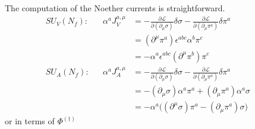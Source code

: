 The computation of the Noether currents is straightforward.
\begin{subequations}
    \begin{align}
        &&SU_V(N_f):&&\alpha^aJ_V^{a,\mu}&=-\frac{\partial\mathscr{L}}{\partial(\partial_\mu\sigma)}\delta\sigma-\frac{\partial\mathscr{L}}{\partial(\partial_\mu\pi^a)}\delta\pi^a&&&&\\
        &&&&&=(\partial^\mu\pi^a)\epsilon^{abc}\alpha^b\pi^c\\
        &&&&&=-\alpha^a\epsilon^{abc}(\partial^\mu\pi^b)\pi^c\\
        &&SU_A(N_f):&&\alpha^aJ_A^{a,\mu}&=-\frac{\partial\mathscr{L}}{\partial(\partial_\mu\sigma)}\delta\sigma-\frac{\partial\mathscr{L}}{\partial(\partial_\mu\pi^a)}\delta\pi^a&&&&\\
        &&&&&=-(\partial_\mu\sigma)\alpha^a\pi^a+(\partial_\mu\pi^a)\alpha^a\sigma\\
        &&&&&=-\alpha^a\big((\partial^\mu\sigma)\pi^a-(\partial_\mu\pi^a)\sigma\big)
    \end{align}
\end{subequations}
or in terms of $\Phi^{(\dagger)}$
